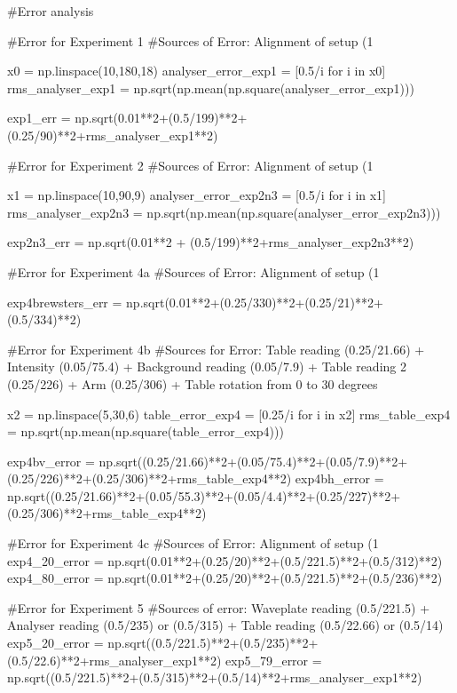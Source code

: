 \documentclass{article}
\begin{document}
\begin{python}
#Error analysis

#Error for Experiment 1
#Sources of Error: Alignment of setup (1%

x0 = np.linspace(10,180,18)
analyser_error_exp1 = [0.5/i for i in x0]
rms_analyser_exp1 = np.sqrt(np.mean(np.square(analyser_error_exp1)))

exp1_err = np.sqrt(0.01**2+(0.5/199)**2+(0.25/90)**2+rms_analyser_exp1**2)

#Error for Experiment 2
#Sources of Error: Alignment of setup (1%

x1 = np.linspace(10,90,9)
analyser_error_exp2n3 = [0.5/i for i in x1]
rms_analyser_exp2n3 = np.sqrt(np.mean(np.square(analyser_error_exp2n3)))

exp2n3_err = np.sqrt(0.01**2 + (0.5/199)**2+rms_analyser_exp2n3**2)

#Error for Experiment 4a
#Sources of Error: Alignment of setup (1%
 
exp4brewsters_err = np.sqrt(0.01**2+(0.25/330)**2+(0.25/21)**2+(0.5/334)**2)

#Error for Experiment 4b
#Sources for Error: Table reading (0.25/21.66) + Intensity (0.05/75.4) + Background reading (0.05/7.9) + Table reading 2 (0.25/226) + Arm (0.25/306) + Table rotation from 0 to 30 degrees

x2 = np.linspace(5,30,6)
table_error_exp4 = [0.25/i for i in x2]
rms_table_exp4 = np.sqrt(np.mean(np.square(table_error_exp4)))

exp4bv_error = np.sqrt((0.25/21.66)**2+(0.05/75.4)**2+(0.05/7.9)**2+(0.25/226)**2+(0.25/306)**2+rms_table_exp4**2)
exp4bh_error = np.sqrt((0.25/21.66)**2+(0.05/55.3)**2+(0.05/4.4)**2+(0.25/227)**2+(0.25/306)**2+rms_table_exp4**2)

#Error for Experiment 4c
#Sources of Error: Alignment of setup (1%
exp4_20_error = np.sqrt(0.01**2+(0.25/20)**2+(0.5/221.5)**2+(0.5/312)**2)
exp4_80_error = np.sqrt(0.01**2+(0.25/20)**2+(0.5/221.5)**2+(0.5/236)**2)

#Error for Experiment 5
#Sources of error: Waveplate reading (0.5/221.5) + Analyser reading (0.5/235) or (0.5/315) + Table reading (0.5/22.66) or (0.5/14)
exp5_20_error = np.sqrt((0.5/221.5)**2+(0.5/235)**2+(0.5/22.6)**2+rms_analyser_exp1**2)
exp5_79_error = np.sqrt((0.5/221.5)**2+(0.5/315)**2+(0.5/14)**2+rms_analyser_exp1**2)
\end{python}
\end{document}
